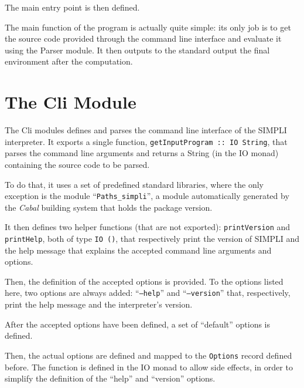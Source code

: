 \documentclass{esposito-documentation}
\begin{document}


The main entry point is then defined. 


The main function of the program is actually quite simple: its only job is to
get the source code provided through the command line interface and evaluate it
using the Parser module. It then outputs to the standard output the final
environment after the computation.

\section{The Cli Module}



The Cli modules defines and parses the command line interface of the SIMPLI
interpreter. It exports a single function,
\lstinline|getInputProgram :: IO String|, that parses the command line
arguments and returns a String (in the IO monad) containing the source code to
be parsed.

To do that, it uses a set of predefined standard libraries, where the only
exception is the module ``\texttt{Paths_simpli}'', a module automatically
generated by the \emph{Cabal} building system \cite{CabalTeam2020} that holds
the package version.



It then defines two helper functions (that are not exported):
\lstinline|printVersion| and \lstinline|printHelp|, both of type
\lstinline|IO ()|, that respectively print the version of SIMPLI and the help
message that explains the accepted command line arguments and options.



Then, the definition of the accepted options is provided. To the options listed
here, two options are always added: ``\texttt{--help}'' and
``\texttt{--version}'' that, respectively, print the help message and the
interpreter's version.



After the accepted options have been defined, a set of ``default'' options is
defined.



Then, the actual options are defined and mapped to the \lstinline|Options|
record defined before. The function is defined in the IO monad to allow side
effects, in order to simplify the definition of the ``help'' and ``version''
options.
\end{document}
